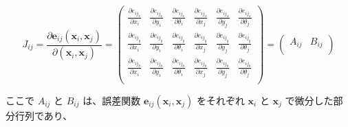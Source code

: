 \documentclass{article}
\begin{document}
\[
J_{ij} =
\frac{\partial \bm{e}_{ij}(\bm{x}_i, \bm{x}_j)}{\partial (\bm{x}_i,\bm{x}_j)} =
\left(
  \begin{array}{cccccc}
    \frac{\partial e_{ij_x}}{\partial x_i} & \frac{\partial e_{ij_x}}{\partial y_i} & \frac{\partial e_{ij_x}}{\partial \theta_i} & \frac{\partial e_{ij_x}}{\partial x_j} & \frac{\partial e_{ij_x}}{\partial y_j} & \frac{\partial e_{ij_x}}{\partial \theta_j} \\
    \frac{\partial e_{ij_y}}{\partial x_i} & \frac{\partial e_{ij_y}}{\partial y_i} & \frac{\partial e_{ij_y}}{\partial \theta_i} & \frac{\partial e_{ij_y}}{\partial x_j} & \frac{\partial e_{ij_y}}{\partial y_j} & \frac{\partial e_{ij_y}}{\partial \theta_j} \\
    \frac{\partial e_{ij_\theta}}{\partial x_i} & \frac{\partial e_{ij_\theta}}{\partial y_i} & \frac{\partial e_{ij_\theta}}{\partial \theta_i} & \frac{\partial e_{ij_\theta}}{\partial x_j} & \frac{\partial e_{ij_\theta}}{\partial y_j} & \frac{\partial e_{ij_\theta}}{\partial \theta_j} \\
  \end{array}
\right) =
\left(
  \begin{array}{cc}
    A_{ij} & B_{ij} \\
  \end{array}
\right)
\]

ここで $A_{ij}$ と $B_{ij}$ は、誤差関数 $\bm{e}_{ij}(\bm{x}_i, \bm{x}_j)$ をそれぞれ $\bm{x}_i$ と $\bm{x}_j$ で微分した部分行列であり、
\end{document}
